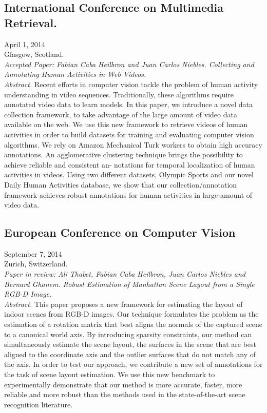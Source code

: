 \documentclass[letterpaper,10pt]{article}
\begin{document}
\subsection{International Conference on Multimedia Retrieval.} \hfill April 1, 2014 \\ 
Glasgow, Scotland. \\
\emph{Accepted Paper: Fabian Caba Heilbron and Juan Carlos Niebles. Collecting and Annotating Human Activities in Web Videos.}
\\ \emph{Abstract.} Recent efforts in computer vision tackle the problem of human activity understanding in video sequences. Traditionally, these algorithms require annotated video data to learn models. In this paper, we introduce a novel data collection framework, to take advantage of the large amount of video data available on the web. We use this new framework to retrieve videos of human activities in order to build datasets for training and evaluating computer vision algorithms. We rely on Amazon Mechanical Turk workers to obtain high accuracy annotations. An agglomerative clustering technique brings the possibility to achieve reliable and consistent an- notations for temporal localization of human activities in videos. Using two different datasets, Olympic Sports and our novel Daily Human Activities database, we show that our collection/annotation framework achieves robust annotations for human activities in large amount of video data.

\subsection{European Conference on Computer Vision} \hfill September 7, 2014 \\ 
Zurich, Switzerland. \\
\emph{Paper in review: Ali Thabet, Fabian Caba Heilbron, Juan Carlos Niebles and Bernard Ghanem. Robust Estimation of Manhattan Scene Layout from a Single RGB-D Image.}
\\ \emph{Abstract.} This paper proposes a new framework for estimating the layout of indoor scenes from RGB-D images. Our technique formulates the problem as the estimation of a rotation matrix that best aligns the normals of the captured scene to a canonical world axis. 
By introducing sparsity constraints, our method can simultaneously estimate the scene layout, the surfaces in the scene that are 
best aligned to the coordinate axis and the outlier surfaces that do not match any of the axis. In order to test our approach, we contribute a new set of annotations for the task of scene layout estimation. We use this new benchmark to experimentally demonstrate that our method is more accurate, faster, more reliable and more robust than the methods used in the state-of-the-art scene recognition literature. 
\end{document}
